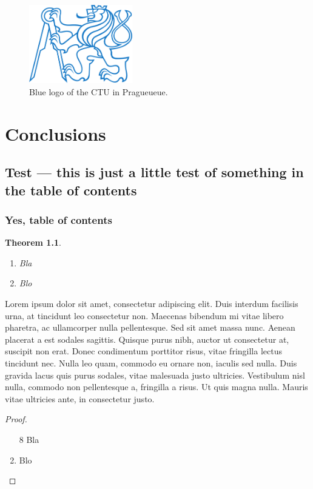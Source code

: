 \documentclass[twoside]{ctuthesis}
\theoremstyle{plain}
\newtheorem{theorem}{Theorem}[chapter]
\theoremstyle{definition}
\theoremstyle{note}
\begin{document}
\begin{figure}[!t]
\includegraphics[width=0.4\textwidth]{ctu_logo_blue}
\caption{Blue logo of the CTU in Pragueueue.}
\end{figure}

\chapter{Conclusions}

\section{Test --- this is just a little test of something in the table of contents}

\subsection{Yes, table of contents}

\begin{theorem}\begin{enumerate} \item Bla \item Blo \end{enumerate} \end{theorem}


Lorem ipsum dolor sit amet, consectetur adipiscing elit. Duis interdum facilisis urna, at tincidunt leo consectetur non. Maecenas bibendum mi vitae libero pharetra, ac ullamcorper nulla pellentesque. Sed sit amet massa nunc. Aenean placerat a est sodales sagittis. Quisque purus nibh, auctor ut consectetur at, suscipit non erat. Donec condimentum porttitor risus, vitae fringilla lectus tincidunt nec. Nulla leo quam, commodo eu ornare non, iaculis sed nulla. Duis gravida lacus quis purus sodales, vitae malesuada justo ultricies. Vestibulum nisl nulla, commodo non pellentesque a, fringilla a risus. Ut quis magna nulla. Mauris vitae ultricies ante, in consectetur justo. 

\medskip

\begin{proof}\begin{enumerate} \item[8] Bla \item Blo \end{enumerate} \end{proof}

\appendix

\printindex

\appendix




\end{document}
